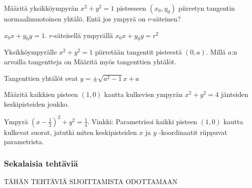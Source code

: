 \begin{tehtavasivu}
\begin{tehtava}
Määritä yksikköympyrän $x^2+y^2= 1$ pisteeseen $(x_{0}, y_{0} )$ piirretyn tangentin normaalimuotoinen yhtälö. Entä jos ympyrä on $r$-säteinen?
\begin{vastaus}
$x_0x+y_0y=1 $. $r$-säteisellä ympyrällä $x_0x+y_0y=r^2$
\end{vastaus}
\end{tehtava}

\begin{tehtava}
Yksikköympyrälle $x^2+y^2=1$ piirretään tangentit pisteestä $(0, a)$. Millä $a$:n arvoilla tangentteja on 
Määritä myös tangenttien yhtälöt.
\begin{vastaus}
Tangenttien yhtälöt ovat $ y = \pm \sqrt{a^2-1}x+a$
\end{vastaus}
\end{tehtava}

\begin{tehtava}

\begin{vastaus}
\end{vastaus}
\end{tehtava}

\begin{tehtava}
Määritä kaikkien pisteen $(1,0)$ kautta kulkevien ympyrän $x^2+y^2 = 4$ jänteiden keskipisteiden joukko.
	\begin{vastaus}
		Ympyrä $(x-\frac{1}{2})^2+y^2 = \frac{1}{4}$. Vinkki: Parametrisoi kaikki 			pisteen $(1,0)$ kautta kulkevat suorat, jatutki miten keskipisteiden $x$ ja 		$y$ -koordinaatit riippuvat parametrista.
	\end{vastaus}
\end{tehtava}

\subsubsection*{Sekalaisia tehtäviä}


TÄHÄN TEHTÄVIÄ SIJOITTAMISTA ODOTTAMAAN


\end{tehtavasivu}
